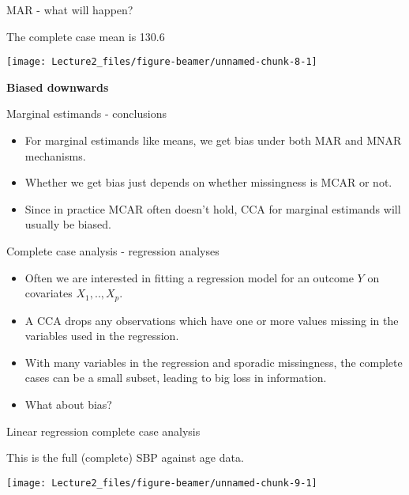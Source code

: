 \documentclass[ignorenonframetext,]{beamer}
\providecommand{\tightlist}{%
  \setlength{\itemsep}{0pt}\setlength{\parskip}{0pt}}
\begin{document}
\begin{frame}{MAR - what will happen?}
\protect\hypertarget{mar---what-will-happen-1}{}

The complete case mean is 130.6

\begin{center}\texttt{[image: Lecture2\_files/figure-beamer/unnamed-chunk-8-1]} \end{center}

\textbf{Biased downwards}

\end{frame}

\begin{frame}{Marginal estimands - conclusions}
\protect\hypertarget{marginal-estimands---conclusions}{}

\begin{itemize}
\tightlist
\item
  For marginal estimands like means, we get bias under both MAR and MNAR
  mechanisms.
\item
  Whether we get bias just depends on whether missingness is MCAR or
  not.
\item
  Since in practice MCAR often doesn't hold, CCA for marginal estimands
  will usually be biased.
\end{itemize}

\end{frame}

\begin{frame}{Complete case analysis - regression analyses}
\protect\hypertarget{complete-case-analysis---regression-analyses}{}

\begin{itemize}
\tightlist
\item
  Often we are interested in fitting a regression model for an outcome
  \(Y\) on covariates \(X_{1},..,X_{p}\).
\item
  A CCA drops any observations which have one or more values missing in
  the variables used in the regression.
\item
  With many variables in the regression and sporadic missingness, the
  complete cases can be a small subset, leading to big loss in
  information.
\item
  What about bias?
\end{itemize}

\end{frame}

\begin{frame}{Linear regression complete case analysis}
\protect\hypertarget{linear-regression-complete-case-analysis}{}

This is the full (complete) SBP against age data.

\begin{center}\texttt{[image: Lecture2\_files/figure-beamer/unnamed-chunk-9-1]} \end{center}

\end{frame}
\end{document}
